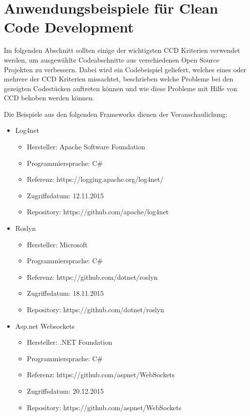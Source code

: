\chapter{Anwendungsbeispiele für Clean Code Development}
\label{cha:Anwendung}

Im folgenden Abschnitt sollten einige der wichtigsten CCD Kriterien verwendet werden, um ausgewählte Codeabschnitte aus verschiedenen Open Source Projekten zu verbessern. Dabei wird ein Codebeispiel geliefert, welches eines oder mehrere der CCD Kriterien missachtet, beschrieben welche Probleme bei den gezeigten Codestücken auftreten können und wie diese Probleme mit Hilfe von CCD behoben werden können.

\SuperPar Die Beispiele aus den folgenden Frameworks dienen der Veranschaulichung:

\begin{itemize}
	\item Log4net 
		\begin{itemize}
			\item Hersteller: Apache Software Foundation
			\item Programmiersprache: C\#
			\item Referenz: https://logging.apache.org/log4net/
			\item Zugriffsdatum: 12.11.2015
			\item Repository: https://github.com/apache/log4net
		\end{itemize}
	\item Roslyn 		
		\begin{itemize}
			\item Hersteller: Microsoft
			\item Programmiersprache: C\#
			\item Referenz: https://github.com/dotnet/roslyn
			\item Zugriffsdatum: 18.11.2015
			\item Repository: https://github.com/dotnet/roslyn
		\end{itemize}
	\item Asp.net Websockets 
		\begin{itemize}
			\item Hersteller: .NET Foundation
			\item Programmiersprache: C\#
			\item Referenz: https://github.com/aspnet/WebSockets
			\item Zugriffsdatum: 20.12.2015
			\item Repository: https://github.com/aspnet/WebSockets

\end{itemize}
\end{itemize}
